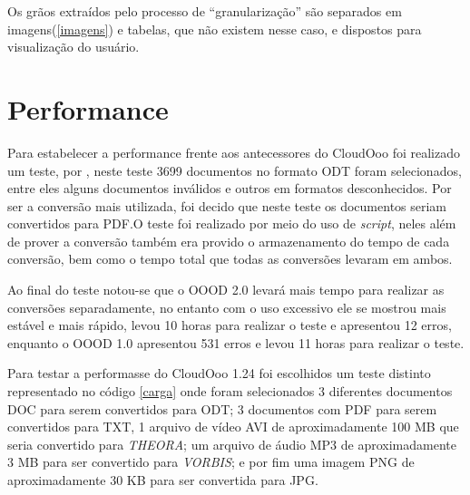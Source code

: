 \newpage
Os grãos extraídos pelo processo de ``granularização'' são separados em imagens(\ref{imagens}) e tabelas, que não existem nesse caso, e dispostos para visualização do usuário.


\newpage
\section{Performance}

Para estabelecer a performance frente aos antecessores do CloudOoo foi realizado um teste, por \cite{MONNERAT}, neste teste 3699 documentos no formato ODT foram selecionados, entre eles alguns documentos inválidos e outros em formatos desconhecidos. Por ser a conversão mais utilizada, foi decido que neste teste os documentos seriam convertidos para PDF.O teste foi realizado por meio do uso de \textit{script}, neles além de prover a conversão também era provido o armazenamento do tempo de cada conversão, bem como o tempo total que todas as conversões levaram em ambos.

Ao final do teste notou-se que o OOOD 2.0 levará mais tempo para realizar as conversões separadamente, no entanto com o uso excessivo ele se mostrou mais estável e mais rápido, levou 10 horas para realizar o teste e apresentou 12 erros, enquanto o OOOD 1.0 apresentou 531 erros e levou 11 horas para realizar o teste.

Para testar a performasse do CloudOoo 1.24 foi escolhidos um teste distinto representado no código \ref{carga} onde foram selecionados 3 diferentes documentos DOC para serem convertidos para ODT; 3 documentos com PDF para serem convertidos para TXT, 1 arquivo de vídeo AVI de aproximadamente 100 MB que seria convertido para \textit{THEORA}; um arquivo de áudio MP3 de aproximadamente 3 MB para ser convertido para \textit{VORBIS}; e por fim uma imagem PNG de aproximadamente 30 KB para ser convertida para JPG.

